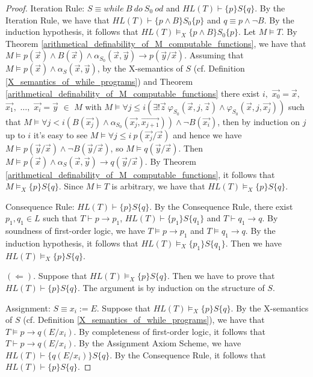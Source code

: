 \documentclass[a4paper,11pt]{article}
\begin{document}
\begin{proof}
Iteration Rule: $S \equiv while\ B\ do\ S_0\ od$ and $HL(T) \vdash \{p\} S \{q\}$. By the Iteration Rule, we have that $HL(T) \vdash \{p \wedge B\} S_0 \{p\}$ and $q \equiv p \wedge \neg B$. By the induction hypothesis, it follows that $HL(T) \models_X \{p \wedge B\} S_0 \{p\}$. Let $M\models T$. By Theorem \ref{arithmetical_definability_of_M_computable_functions}, we have that $M \models p(\vec{x})\wedge B(\vec{x})\wedge \alpha_{S_0}(\vec{x},\vec{y})\rightarrow p(\vec{y}/\vec{x})$. Assuming that $M \models p(\vec{x}) \wedge \alpha_S(\vec{x},\vec{y})$, by the X-semantics of $S$ (cf. Definition \ref{X_semantics_of_while_programs}) and Theorem \ref{arithmetical_definability_of_M_computable_functions} there exist $i,$ $\vec{x_0}=\vec{x},$ $\vec{x_1},$ $\ldots,$ $\vec{x_i}=\vec{y}$ $\in$ $M$ with $M\models \forall j\leq i ( \exists! \vec{z}\ \varphi_{S_0}(\vec{x},j,\vec{z}) \wedge \varphi_{S_0}(\vec{x},j,\vec{x_j}) )$ such that $M\models \forall j<i ( B(\vec{x_j}) \wedge \alpha_{S_0}(\vec{x_j},\vec{x_{j+1}}) ) \wedge \neg B(\vec{x_i})$, then by induction on $j$ up to $i$ it's easy to see $M\models \forall j\leq i\ p(\vec{x_j}/\vec{x})$ and hence we have $M \models p(\vec{y}/\vec{x}) \wedge \neg B(\vec{y}/\vec{x})$, so $M\models q(\vec{y}/\vec{x})$. Then $M\models p(\vec{x}) \wedge \alpha_S(\vec{x},\vec{y})\rightarrow q(\vec{y}/\vec{x})$. By Theorem \ref{arithmetical_definability_of_M_computable_functions}, it follows that $M\models_X \{p\} S \{q\}$. Since $M\models T$ is arbitrary, we have that $HL(T)\models_X \{p\} S \{q\}$.

Consequence Rule: $HL(T) \vdash \{p\} S \{q\}$. By the Consequence Rule, there exist $p_1,q_1\in L$ such that $T \vdash p\rightarrow p_1$, $HL(T) \vdash \{p_1\}S\{q_1\}$ and $T \vdash q_1\rightarrow q$. By soundness of first-order logic, we have $T \models p\rightarrow p_1$ and $T \models q_1\rightarrow q$. By the induction hypothesis, it follows that $HL(T) \models_X \{p_1\}S\{q_1\}$. Then we have $HL(T)\models_X \{p\} S \{q\}$.

$(\Leftarrow)$. Suppose that $HL(T)\models_X \{p\} S \{q\}$. Then we have to prove that $HL(T)\vdash \{p\} S \{q\}$. The argument is by induction on the structure of $S$.

Assignment: $S \equiv x_i := E$. Suppose that $HL(T)\models_X \{p\} S \{q\}$. By the X-semantics of $S$ (cf. Definition \ref{X_semantics_of_while_programs}), we have that $T\models p\rightarrow q(E/x_i)$. By completeness of first-order logic, it follows that $T \vdash p\rightarrow q(E/x_i)$. By the Assignment Axiom Scheme, we have $HL(T) \vdash \{q(E/x_i)\} S \{q\}$. By the Consequence Rule, it follows that $HL(T) \vdash \{p\} S \{q\}$.


\end{proof}
\end{document}
